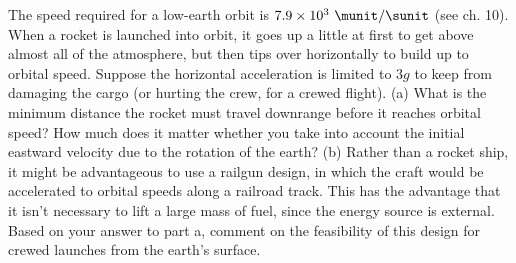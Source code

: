  The speed required for a low-earth orbit is 
$7.9\times10^3\ \munit/\sunit$ (see ch. 10). When a rocket is launched into orbit, it
goes up a little at first to get above almost all of the
atmosphere, but then tips over horizontally to build up to
orbital speed. Suppose the horizontal acceleration is
limited to $3g$ to keep from damaging the cargo (or hurting
the crew, for a crewed flight). (a) What is the minimum
distance the rocket must travel downrange before it reaches
orbital speed? How much does it matter whether you take into
account the initial eastward velocity due to the rotation of
the earth? (b) Rather than a rocket ship, it might be
advantageous to use a railgun design, in which the craft
would be accelerated to orbital speeds along a railroad
track. This has the advantage that it isn't necessary to
lift a large mass of fuel, since the energy source is
external. Based on your answer to part a, comment on the
feasibility of this design for crewed launches from
the earth's surface.
